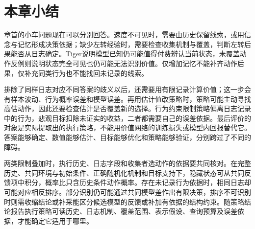 \section{本章小结}
\label{sec:rl-information-summary}

章首的小车问题现在可以分别回答。速度不可见时，需要由历史保留线索，或用信念与记忆形成决策依据；缺少左转经验时，需要检查收集机制与覆盖，判断左转后果能否从日志确定。Tiger说明模型已知仍可能值得付费辨认当前状态，未覆盖动作反例则说明状态完全可见也仍可能无法识别价值。仅增加记忆不能补齐动作后果，仅补充同类行为也不能找回未记录的线索。

排除了同样日志对应不同答案的歧义以后，还需要用有限记录计算价值；这一步会有样本波动、行为概率误差和模型误差。再用估计值改策略时，策略可能主动寻找高估动作，因此还要检查估计是否覆盖新的选择。行为约束限制策略偏离日志记录中的行为，悲观目标扣除未证实的收益，二者都需要自己的误差依据。最后评价的对象是实际提取出的执行策略，不能用价值网络的训练损失或模型内回报替代它。答案能够确定、数值能够估计、目标能够优化和策略能够验证，分别跨过了不同的障碍。

两类限制叠加时，执行历史、日志字段和收集者选动作的依据要共同核对。在完整历史、共同环境与初始条件、正确随机化机制和目标支持下，隐藏状态可从共同反馈项中积分，概率比只含历史条件动作概率。存在未记录行为依据时，相同日志却可能对应相反排序。部分识别仍可能通过共同模型差作出有限决策，排序不可识别时则需收缩结论或补采能区分候选模型的反馈或补加有依据的结构约束。随策略结论报告执行策略可读历史、日志机制、覆盖范围、表示假设、查询预算及误差依据，才能确定它适用于哪里。
